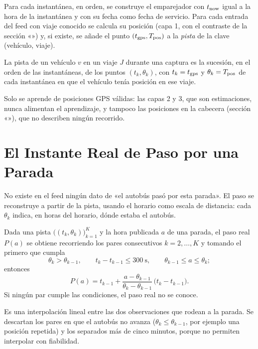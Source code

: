 Para cada instantánea, en orden, se construye el emparejador con $t_{\mathrm{now}}$ igual a la hora de la instantánea y con su
fecha como fecha de servicio. Para cada entrada del feed con viaje conocido se calcula su posición (capa 1, con el
contraste de la sección «») y, si existe, se añade el punto $(t_{\mathrm{gps}},T_{\mathrm{pos}})$ a la
\emph{pista} de la clave (vehículo, viaje).

\begin{definicion}[Pista]
La pista de un vehículo $v$ en un viaje $J$ durante una captura es la sucesión, en el orden de las instantáneas, de
los puntos $(t_k,\theta_k)$, con $t_k=t_{\mathrm{gps}}$ y $\theta_k=T_{\mathrm{pos}}$ de cada instantánea en que el vehículo tenía posición
en ese viaje.
\end{definicion}

Solo se aprende de posiciones GPS válidas: las capas 2 y 3, que son estimaciones, nunca alimentan el aprendizaje, y
tampoco las posiciones en la cabecera (sección «»), que no describen ningún recorrido.

\section{El Instante Real de Paso por una Parada}
\label{sec:paso-real}

No existe en el feed ningún dato de «el autobús pasó por esta parada». El paso se reconstruye a partir de la pista, usando el
horario como escala de distancia: cada $\theta_k$ indica, en horas del horario, dónde estaba el autobús.

\begin{definicion}
\label{def:paso-real}
Dada una pista $\big((t_k,\theta_k)\big)_{k=1}^{K}$ y la hora publicada $a$ de una parada, el paso real $P(a)$ se
obtiene recorriendo los pares consecutivos $k=2,\dots,K$ y tomando el primero que cumpla
\[
\theta_k>\theta_{k-1},\qquad t_k-t_{k-1}\le300\ \text{s},\qquad \theta_{k-1}\le a\le\theta_k;
\]
entonces
\begin{equation}
\label{eq:paso-real}
P(a)=t_{k-1}+\frac{a-\theta_{k-1}}{\theta_k-\theta_{k-1}}\,\big(t_k-t_{k-1}\big).
\end{equation}
Si ningún par cumple las condiciones, el paso real no se conoce.
\end{definicion}

Es una interpolación lineal entre las dos observaciones que rodean a la parada. Se descartan los pares en que el autobús
no avanza ($\theta_k\le\theta_{k-1}$, por ejemplo una posición repetida) y los separados más de cinco minutos, porque no
permiten interpolar con fiabilidad.

